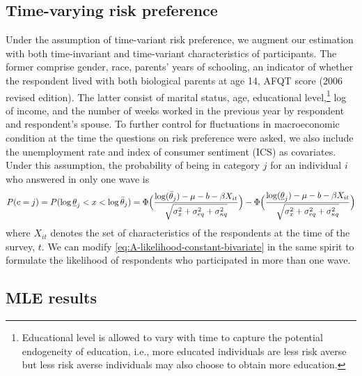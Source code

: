 \documentclass[emulatestandardclasses, 10pt, abstract = true]{scrartcl}
\begin{document}
\subsection{Time-varying risk preference}
Under the assumption of time-variant risk preference, we augment our estimation with both time-invariant and time-variant characteristics of participants. The former comprise gender, race, parents' years of schooling, an indicator of whether the respondent lived with both biological parents at age 14, AFQT score (2006 revised edition). The latter consist of marital status, age, educational level,\footnote{Educational level is allowed to vary with time to capture the potential endogeneity of education, i.e., more educated individuals are less risk averse but less risk averse individuals may also choose to obtain more education.} log of income, and the number of weeks worked in the previous year by respondent and respondent's spouse. To further control for fluctuations in macroeconomic condition at the time the questions on risk preference were asked, we also include the unemployment rate and index of consumer sentiment (ICS) as covariates. Under this assumption, the probability of being in category $j$ for an individual $i$ who answered in only one wave is
\begin{equation}
	P(c=j)=P(\log\underline{\theta}_j<x<\log\bar{\theta}_j)=\Phi\Big({\log(\bar{\theta}_j)-\mu-b-\beta X_{it}\over\sqrt{\sigma_x^2+\sigma_{eq}^2+\sigma_{\kappa q}^2}}\Big)-\Phi\Big({\log(\underline{\theta}_j)-\mu-b-\beta X_{it}\over\sqrt{\sigma_x^2+\sigma_{eq}^2+\sigma_{\kappa q}^2}}\Big) 
	\label{eq:A-likelihood-floating-univariate}	
\end{equation}
where $X_{it}$ denotes the set of characteristics of the respondents at the time of the survey, $t$. We can modify \eqref{eq:A-likelihood-constant-bivariate} in the same spirit to formulate the likelihood of respondents who participated in more than one wave. 

\subsection{MLE results}
\end{document}
